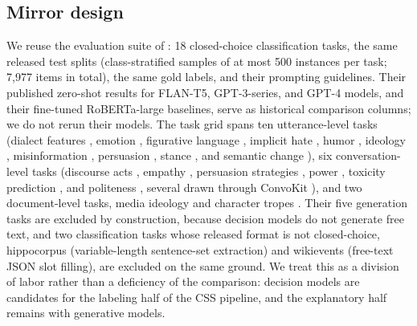 \documentclass[11pt]{article}
\begin{document}
\subsection{Mirror design}
We reuse the evaluation suite of \citet{ziems2024llms}: 18 closed-choice classification tasks, the same released test splits (class-stratified samples of at most 500 instances per task; 7{,}977 items in total), the same gold labels, and their prompting guidelines. Their published zero-shot results for FLAN-T5, GPT-3-series, and GPT-4 models, and their fine-tuned RoBERTa-large baselines, serve as historical comparison columns; we do not rerun their models. The task grid spans ten utterance-level tasks (dialect features \citep{demszky2021dialect}, emotion \citep{saravia2018carer}, figurative language \citep{chakrabarty2022flute}, implicit hate \citep{elsherief2021latent}, humor \citep{weller2019humor}, ideology \citep{iyyer2014political}, misinformation \citep{gabriel2022misinfo}, persuasion \citep{althoff2014favor}, stance \citep{mohammad2016semeval}, and semantic change \citep{loureiro2022tempowic}), six conversation-level tasks (discourse acts \citep{zhang2017coarse}, empathy \citep{sharma2020empathy}, persuasion strategies \citep{yang2019persuasive}, power \citep{danescu2012power}, toxicity prediction \citep{zhang2018awry}, and politeness \citep{danescu2013politeness}, several drawn through ConvoKit \citep{chang2020convokit}), and two document-level tasks, media ideology \citep{baly2020ideology} and character tropes \citep{bamman2013personas, chu2018personas}. Their five generation tasks are excluded by construction, because decision models do not generate free text, and two classification tasks whose released format is not closed-choice, hippocorpus (variable-length sentence-set extraction) and wikievents (free-text JSON slot filling), are excluded on the same ground. We treat this as a division of labor rather than a deficiency of the comparison: decision models are candidates for the labeling half of the CSS pipeline, and the explanatory half remains with generative models.
\end{document}

